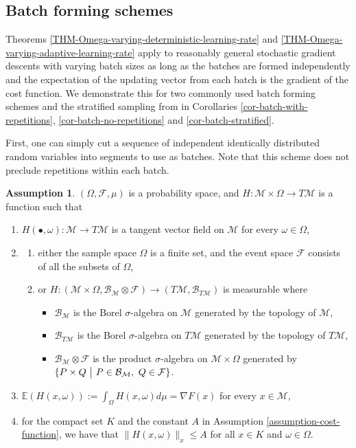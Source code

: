 \documentclass{amsart}
\newcommand{\E}{\mathbb{E}}
\newcommand{\fil}{\mathcal{F}}
\newcommand{\M}{\mathcal{M}}
\newcommand{\B}{\mathcal{B}}
\theoremstyle{plain}
\theoremstyle{definition}
\newtheorem{assumption}[theorem]{Assumption}
\theoremstyle{remark}
\numberwithin{theorem}{section}
\numberwithin{equation}{section}
\begin{document}
\subsection{Batch forming schemes} Theorems \ref{THM-Omega-varying-deterministic-learning-rate} and \ref{THM-Omega-varying-adaptive-learning-rate} apply to reasonably general stochastic gradient descents with varying batch sizes as long as the batches are formed independently and the expectation of the updating vector from each batch is the gradient of the cost function. We demonstrate this for two commonly used batch forming schemes and the stratified sampling from \cite{ZZ} in Corollaries \ref{cor-batch-with-repetitions}, \ref{cor-batch-no-repetitions} and \ref{cor-batch-stratified}. 

First, one can simply cut a sequence of independent identically distributed random variables into segments to use as batches. Note that this scheme does not preclude repetitions within each batch.

\begin{assumption}\label{assumption-probability-space-fixed}
$(\Omega,\fil, \mu)$ is a probability space, and $H:\M \times \Omega \rightarrow T\M$ is a function such that
  \begin{enumerate}
		\item $H(\bullet, \omega): \M\rightarrow T\M$ is a tangent vector field on $\M$ for every $\omega \in \Omega$,
		\item 
		 \begin{enumerate}
		  \item either the sample space $\Omega$ is a finite set, and the event space $\fil$ consists of all the subsets of $\Omega$,
		  \item or  $H:(\M \times \Omega, \B_{\M}\otimes \fil) \rightarrow (T\M, \B_{T\M})$ is measurable where
			 \begin{itemize}
				 \item $\B_{\M}$ is the Borel $\sigma$-algebra on $\M$ generated by the topology of $\M$,
				 \item $\B_{T\M}$ is the Borel $\sigma$-algebra on $T\M$ generated by the topology of $T\M$,
				 \item $\B_{\M}\otimes \fil$ is the product $\sigma$-algebra on $\M \times \Omega$ generated by $\{P\times Q~\big{|}~P\in \B_{\M}, ~Q \in \fil\}$.
			 \end{itemize}
	   \end{enumerate}
	  \item $\E(H(x, \omega)) :=\int_{\Omega} H(x, \omega) d\mu = \nabla F(x)$ for every  $x \in \M$, 
	 \item for the compact set $K$ and the constant $A$ in Assumption \ref{assumption-cost-function}, we have that $\| H(x,\omega)\|_x \leq A$ for all $x \in K$ and $\omega \in \Omega$.
	\end{enumerate}
\end{assumption}
\end{document}
